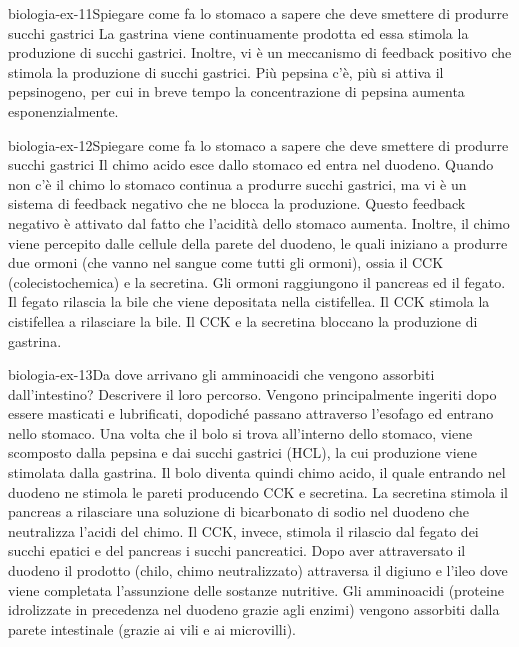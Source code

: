 \documentclass[preview]{standalone}
\begin{document}
\begin{snippetexercise}{biologia-ex-11}{Spiegare come fa lo stomaco a sapere che deve smettere di produrre succhi gastrici}
    La gastrina viene continuamente prodotta ed essa stimola la produzione di succhi gastrici.
    Inoltre, vi è un meccanismo di feedback positivo che stimola la produzione di succhi gastrici.
    Più pepsina c'è, più si attiva il pepsinogeno, per cui in breve tempo la concentrazione di pepsina aumenta esponenzialmente.
\end{snippetexercise}

\begin{snippetexercise}{biologia-ex-12}{Spiegare come fa lo stomaco a sapere che deve smettere di produrre succhi gastrici}
    Il chimo acido esce dallo stomaco ed entra nel duodeno.
    Quando non c'è il chimo lo stomaco continua a produrre succhi gastrici,
    ma vi è un sistema di feedback negativo che ne blocca la produzione.
    Questo feedback negativo è attivato dal fatto che l'acidità dello stomaco aumenta.
    Inoltre, il chimo viene percepito dalle cellule della parete del duodeno, le quali iniziano a produrre
    due ormoni (che vanno nel sangue come tutti gli ormoni), ossia il CCK (colecistochemica) e la secretina.
    Gli ormoni raggiungono il pancreas ed il fegato.
    Il fegato rilascia la bile che viene depositata nella cistifellea.
    Il CCK stimola la cistifellea a rilasciare la bile.
    Il CCK e la secretina bloccano la produzione di gastrina.
\end{snippetexercise}


\begin{snippetexercise}{biologia-ex-13}{Da dove arrivano gli amminoacidi che vengono
    assorbiti dall'intestino? Descrivere il loro percorso.}
    Vengono principalmente ingeriti dopo essere masticati e lubrificati, dopodiché passano attraverso
    l'esofago ed entrano nello stomaco. Una volta che il bolo si trova all'interno dello stomaco,
    viene scomposto dalla pepsina e dai succhi gastrici (HCL), la cui produzione viene stimolata dalla gastrina.
    Il bolo diventa quindi chimo acido, il quale entrando nel duodeno ne stimola le pareti producendo
    CCK e secretina. La secretina stimola il pancreas a rilasciare una soluzione di bicarbonato di sodio
    nel duodeno che neutralizza l'acidi del chimo.
    Il CCK, invece, stimola il rilascio dal fegato dei succhi epatici e del pancreas i succhi pancreatici.
    Dopo aver attraversato il duodeno il prodotto (chilo, chimo neutralizzato) attraversa il digiuno e l'ileo dove
    viene completata l'assunzione delle sostanze nutritive.
    Gli amminoacidi (proteine idrolizzate in precedenza nel duodeno grazie agli enzimi) vengono assorbiti dalla parete intestinale (grazie ai vili e ai microvilli).
\end{snippetexercise}
\end{document}
